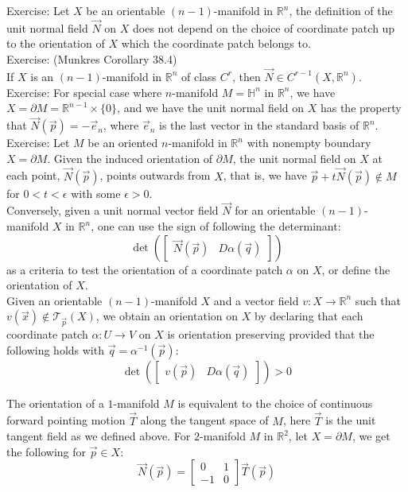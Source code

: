 \documentclass[11pt,oneside]{book}
\theoremstyle{break}
\theoremstyle{break}
\newcommand{\R}{\mathbb{R}}
\newcommand{\T}{\mathcal{T}}
\newcommand{\pd}{\partial}
\newcommand{\bmat}[1]{\begin{bmatrix} #1 \end{bmatrix}}
\newcommand{\exercise}{\color{green}Exercise: \color{black}}
\begin{document}
\exercise Let $X$ be an orientable $(n-1)$-manifold in $\R^n$, the definition of the unit normal field $\vec{N}$ on $X$ does not depend on the choice of coordinate patch up to the orientation of $X$ which the coordinate patch belongs to.\\ 

\exercise (Munkres Corollary 38.4)\\
If $X$ is an $(n-1)$-manifold in $\R^n$ of class $C^r$, then $\vec{N} \in C^{r-1}(X, \R^n)$. \\

\exercise For special case where $n$-manifold $M= \mathbb{H}^n$ in $\R^n$, we have $X = \pd M = \R^{n-1}\times \{0\}$, and we have the unit normal field on $X$ has the property that $\vec{N}(\vec{p}) = -\vec{e}_n$, where $\vec{e}_n$ is the last vector in the standard basis of $\R^n$. \\

\exercise Let $M$ be an oriented $n$-manifold in $\R^n$ with nonempty boundary $X = \pd M$. Given the induced orientation of $\partial M$, the unit normal field on $X$ at each point, $\vec{N}(\vec{p})$, points outwards from $X$, that is, we have $\vec{p} + t\vec{N}(\vec{p}) \notin M$ for $0<t<\epsilon$ with some $\epsilon>0$. \\

Conversely, given a unit normal vector field $\vec{N}$ for an orientable $(n-1)$-manifold $X$ in $\R^n$, one can use the sign of following the determinant:
$$\det\left(\bmat{\vec{N}(\vec{p})  & D\alpha(\vec{q})}\right)$$ 
as a criteria to test the orientation of a coordinate patch $\alpha$ on $X$, or define the orientation of $X$. \\

Given an orientable $(n-1)$-manifold $X$ and a vector field $v:X \to \R^{n}$ such that $v(\vec{x}) \notin \T_{\vec{p}}(X)$, we obtain an orientation on $X$ by declaring that each coordinate patch $\alpha:U \to V $ on $X$ is orientation preserving provided that the following holds with $\vec{q } = \alpha^{-1}(\vec{p})$: $$\det\left(\bmat{v(\vec{p}) &D\alpha(\vec{q})}\right) >0$$

The orientation of a $1$-manifold $M$ is equivalent to the choice of continuous forward pointing motion $\vec{T}$ along the tangent space of $M$, here $\vec{T}$ is the unit tangent field as we defined above. For $2$-manifold $M $ in $\R^2$, let $X = \pd M$, we get the following for $\vec{p}\in X$:
$$\vec{N}(\vec{p}) = \bmat{0&1 \\ -1 & 0}\vec{T}(\vec{p})$$
\end{document}
